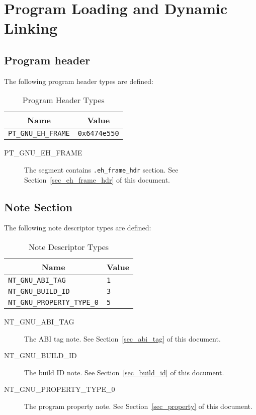 \chapter{Program Loading and Dynamic Linking}

\section{Program header}

The following \xOS program header types are defined:

\begin{table}[H]
\Hrule
  \caption{Program Header Types}
  \begin{center}
    \begin{tabular}[t]{l|l}
      \multicolumn{1}{c}{Name} & \multicolumn{1}{c}{Value} \\
      \hline
      \texttt{PT_GNU_EH_FRAME} & \texttt{0x6474e550} \\
    \end{tabular}
  \end{center}
\Hrule
\end{table}

\begin{description}
 \item[PT_GNU_EH_FRAME]
      The segment contains \texttt{.eh_frame_hdr} section.  See
      Section~\ref{sec_eh_frame_hdr} of this document.
\end{description}

\section{Note Section}

The following note descriptor types are defined:

\begin{table}[H]
\Hrule
  \caption{Note Descriptor Types}
  \begin{center}
    \begin{tabular}[t]{l|l}
      \multicolumn{1}{c}{Name} & \multicolumn{1}{c}{Value} \\
      \hline
      \texttt{NT_GNU_ABI_TAG} & \texttt{1} \\
      \texttt{NT_GNU_BUILD_ID} & \texttt{3} \\
      \texttt{NT_GNU_PROPERTY_TYPE_0} & \texttt{5} \\
    \end{tabular}
  \end{center}
\Hrule
\end{table}

\begin{description}
 \item[NT_GNU_ABI_TAG]
   The ABI tag note.  See Section~\ref{sec_abi_tag} of this document.
 \item[NT_GNU_BUILD_ID]
   The build ID note.  See Section~\ref{sec_build_id} of this document.
 \item[NT_GNU_PROPERTY_TYPE_0]
   The program property note.  See Section~\ref{sec_property} of this
   document.
\end{description}

